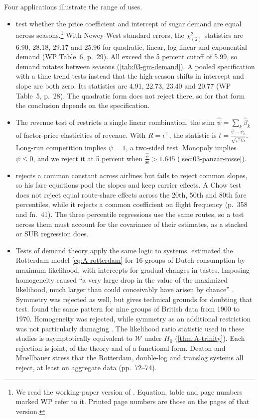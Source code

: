 Four applications illustrate the range of uses.
\begin{itemize}
\item \citet{GenesoveMullin1998} test whether the price coefficient and intercept of sugar demand are equal
  across seasons.\footnote{We read the working-paper version of \citet{GenesoveMullin1998}. Equation, table and
  page numbers marked WP refer to it. Printed page numbers are those on the pages of that version.} With
  Newey-West standard errors, the $\chi^2_{(2)}$ statistics are 6.90, 28.18, 29.17 and 25.96 for quadratic,
  linear, log-linear and exponential demand (WP Table~6, p.~29). All exceed the 5 percent cutoff of 5.99, so
  demand rotates between seasons (\cref{tab:03-gm-demand}). A pooled specification with a time trend tests
  instead that the high-season shifts in intercept and slope are both zero. Its statistics are 4.91, 22.73,
  23.40 and 20.77 (WP Table~5, p.~28). The quadratic form does not reject there, so for that form the
  conclusion depends on the specification.
\item The revenue test of \citet{PanzarRosse1987} restricts a single linear combination, the sum
  $\hat\psi = \sum_k\hat\beta_k$ of factor-price elasticities of revenue. With $R = \iota^\top$, the statistic
  is $t = \frac{\hat\psi - \psi_0}{\sqrt{\iota^\top\hat V\iota}}$. Long-run competition implies $\psi = 1$, a
  two-sided test. Monopoly implies $\psi \le 0$, and we reject it at 5 percent when $\frac{\hat\psi}{\mathrm{se}}
  > 1.645$ (\cref{sec:03-panzar-rosse}).
\item \citet[pp.~353--354]{Borenstein1989} rejects a common constant across airlines but fails to reject
  common slopes, so his fare equations pool the slopes and keep carrier effects. A Chow test does not reject
  equal route-share effects across the 20th, 50th and 80th fare percentiles, while it rejects a common
  coefficient on flight frequency (p.~358 and fn.~41). The three percentile regressions use the same routes,
  so a test across them must account for the covariance of their estimates, as a stacked or SUR regression
  does.
\item Tests of demand theory apply the same logic to systems. \citet{Barten1969} estimated the Rotterdam model
  \eqref{eq:A-rotterdam} for 16 groups of Dutch consumption by maximum likelihood, with intercepts for gradual
  changes in tastes. Imposing homogeneity caused ``a very large drop in the value of the maximized likelihood,
  much larger than could conceivably have arisen by chance'' \citep[pp.~69--70]{DeatonMuellbauer1980b}. Symmetry
  was rejected as well, but \citet{Deaton1972} gives technical grounds for doubting that test. \citet{Deaton1974}
  found the same pattern for nine groups of British data from 1900 to 1970. Homogeneity was rejected, while
  symmetry as an additional restriction was not particularly damaging \citep[p.~70]{DeatonMuellbauer1980b}. The
  likelihood ratio statistic used in these studies is asymptotically equivalent to $\mathcal{W}$ under $H_0$
  (\cref{thm:A-trinity}). Each
  rejection is joint, of the theory and of a functional form. Deaton and Muellbauer stress that the Rotterdam,
  double-log and translog systems all reject, at least on aggregate data (pp.~72--74).
\end{itemize}

